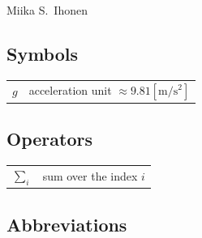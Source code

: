 \documentclass[english,12pt,a4paper,pdftex,elec,utf8]{aaltothesis}
\begin{document}
\vspace{5mm}
{\hfill Miika S.\ Ihonen \hspace{1cm}}



\newpage


\thesistableofcontents




\subsection*{Symbols}

\begin{tabular}{ll}
$g$          & acceleration unit $ \approx 9.81 \mathrm{[m/s^2]}$\\
\end{tabular}

\subsection*{Operators}

\begin{tabular}{ll}
$\sum_i $                       & sum over the index $i$ \\
\end{tabular}

\subsection*{Abbreviations}
\end{document}

